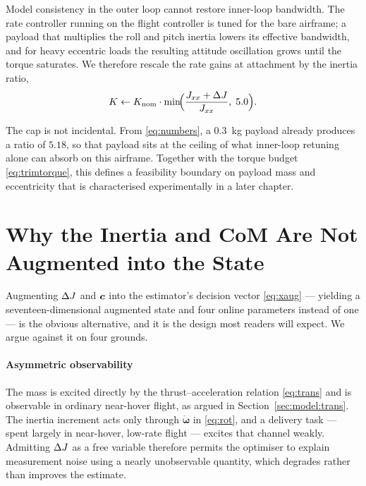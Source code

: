Model consistency in the outer loop cannot restore inner-loop bandwidth.
The rate controller running on the flight controller is tuned for the
bare airframe; a payload that multiplies the roll and pitch inertia
lowers its effective bandwidth, and for heavy eccentric loads the
resulting attitude oscillation grows until the torque saturates. We
therefore rescale the rate gains at attachment by the inertia ratio,
\begin{equation}
K \leftarrow K_{\mathrm{nom}} \cdot
\min\!\Bigl( \frac{J_{xx} + \Delta J}{J_{xx}},\; 5.0 \Bigr).
\label{eq:gain}
\end{equation}

The cap is not incidental. From \eqref{eq:numbers}, a \SI{0.3}{\kg}
payload already produces a ratio of $5.18$, so that payload sits at the
ceiling of what inner-loop retuning alone can absorb on this airframe.
Together with the torque budget \eqref{eq:trimtorque}, this defines a
feasibility boundary on payload mass and eccentricity that is
characterised experimentally in a later chapter.

\section{Why the Inertia and CoM Are Not Augmented into the State}\label{sec:model:whynot}

Augmenting $\Delta J$ and $\bm{c}$ into the estimator's decision vector
\eqref{eq:xaug} --- yielding a seventeen-dimensional augmented state and
four online parameters instead of one --- is the obvious alternative, and
it is the design most readers will expect. We argue against it on four
grounds.

\paragraph{Asymmetric observability} The mass is excited directly by the
thrust--acceleration relation \eqref{eq:trans} and is observable in
ordinary near-hover flight, as argued in
Section~\ref{sec:model:trans}. The inertia increment acts only through
$\dot{\bm{\omega}}$ in \eqref{eq:rot}, and a delivery task --- spent
largely in near-hover, low-rate flight --- excites that channel weakly.
Admitting $\Delta J$ as a free variable therefore permits the optimiser to
explain measurement noise using a nearly unobservable quantity, which
degrades rather than improves the estimate.

